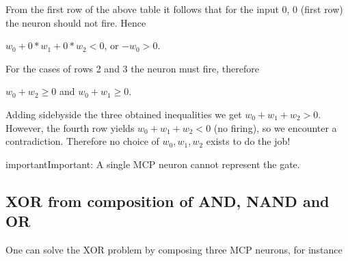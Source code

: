 \documentclass[letterpaper,10pt,english]{jupyterBook}
\begin{document}
\sphinxAtStartPar
From the first row of the above table it follows that for the input 0, 0 (first row) the neuron should not fire. Hence

\sphinxAtStartPar
\(w_0  + 0* w_1 + 0*w_2  < 0\), or \(-w_0>0\).

\sphinxAtStartPar
For the cases of rows 2 and 3 the neuron must fire, therefore

\sphinxAtStartPar
\(w_0+w_2 \ge 0\) and \(w_0+w_1 \ge 0\).

\sphinxAtStartPar
Adding side\sphinxhyphen{}by\sphinxhyphen{}side the three obtained inequalities we get \(w_0+w_1+w_2 > 0\). However, the fourth row yields
\(w_0+w_1+w_2<0\) (no firing), so we encounter a contradiction. Therefore no choice of \(w_0, w_1, w_2\) exists to do the job!

\begin{sphinxadmonition}{important}{Important:}
\sphinxAtStartPar
A single MCP neuron cannot represent the  gate.
\end{sphinxadmonition}


\subsection{XOR from composition of AND, NAND and OR}
\label{\detokenize{docs/mcp:xor-from-composition-of-and-nand-and-or}}
\sphinxAtStartPar
One can solve the XOR problem by composing three MCP neurons, for instance

\begin{sphinxVerbatim}[commandchars=\\\{\}]
   
\end{sphinxVerbatim}

\begin{sphinxVerbatim}[commandchars=\\\{\}]

   \PYG{p}{[}\PYG{p}{]} 
       \PYG{p}{[}\PYG{p}{]} 
\end{sphinxVerbatim}
\end{document}
